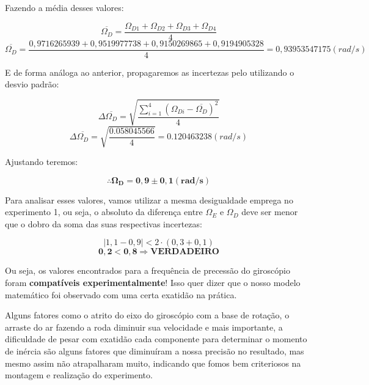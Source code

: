 Fazendo a média desses valores:

\[ \overline{\Omega _D} = \frac{\Omega _{D1} + \Omega _{D2} + \Omega _{D3} + \Omega _{D4}}{4} \]
\[ \overline{\Omega _D} = \frac{0,9716265939 + 0,9519977738 + 0,9150269865 + 0,9194905328}{4} = 0,93953547175 (rad/s) \]

E de forma análoga ao anterior, propagaremos as incertezas pelo utilizando o desvio padrão:

\[ \Delta \overline{\Omega _D} = \sqrt{\frac{\sum_{i=1}^{4} (\Omega _{Di} - \overline{\Omega _D})^2}{4}}\]
\[ \Delta \overline{\Omega _D} = \sqrt{\frac{0.058045566}{4}} = 0.120463238 (rad/s)\]

Ajustando teremos:

\[ \therefore \mathbf{\Omega _D = 0,9 \pm 0,1 (rad/s)}\]

Para analisar esses valores, vamos utilizar a mesma desigualdade emprega no experimento 1, ou seja, o absoluto da diferença entre $\Omega _E$ e $\Omega _D$ deve ser menor que o dobro da soma das suas respectivas incertezas:

\[ | 1,1 - 0,9 | < 2 \cdot (0,3 + 0,1) \]
\[ \mathbf{0,2 < 0,8 \Rightarrow VERDADEIRO} \]

Ou seja, os valores encontrados para a frequência de precessão do giroscópio foram \textbf{compatíveis experimentalmente}! Isso quer dizer que o nosso modelo matemático foi observado com uma certa exatidão na prática.

Alguns fatores como o atrito do eixo do giroscópio com a base de rotação, o arraste do ar fazendo a roda diminuir sua velocidade e mais importante, a dificuldade de pesar com exatidão cada componente para determinar o momento de inércia são alguns fatores que diminuíram a nossa precisão no resultado, mas mesmo assim não atrapalharam muito, indicando que fomos bem criteriosos na montagem e realização do experimento.





